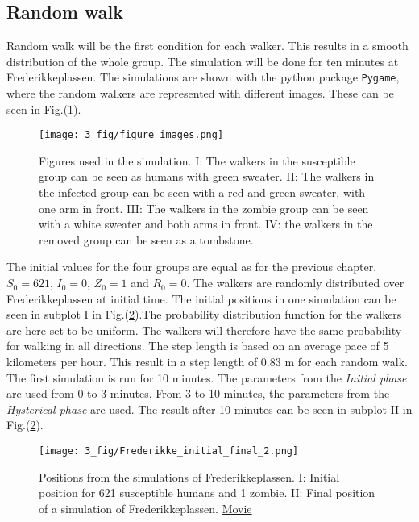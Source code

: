 \documentclass[%
twoside,                 %
final,                   %
chapterprefix=true,      %
open=right               %
10pt]{book}
\begin{document}
\subsection{Random walk}
Random walk will be the first condition for each walker. This results in a smooth distribution of the whole group. The simulation will be done for ten minutes at Frederikkeplassen. The simulations are shown with the python package \Verb!Pygame!, where the random walkers are represented with different images. These can be seen in Fig.(\ref{fig:figure_images}).


\begin{figure}[ht]
  \centerline{\texttt{[image: 3\_fig/figure\_images.png]}}
  \caption{
  \label{fig:figure_images} Figures used in the simulation. I: The walkers in the susceptible group can be seen as humans with green sweater. II: The walkers in the infected group can be seen with a red and green sweater, with one arm in front. III: The walkers in the zombie group can be seen with a white sweater and both arms in front. IV: the walkers in the removed group can be seen as a tombstone.
  }
\end{figure}


The initial values for the four groups are equal as for the previous chapter. $S_0 = 621$, $I_0 = 0$, $Z_0 = 1$ and $R_0 = 0$. The walkers are randomly distributed over Frederikkeplassen at initial time. The initial positions in one simulation can be seen in subplot I in Fig.(\ref{fig:initial_final}).The probability distribution function for the walkers are here set to be uniform. The walkers will therefore have the same probability for walking in all directions. The step length is based on an average pace of 5 kilometers per hour. This result in a step length of 0.83 m for each random walk. The first simulation is run for 10 minutes. The parameters from the \emph{Initial phase} are used from 0 to 3 minutes. From 3 to 10 minutes, the parameters from the \emph{Hysterical phase} are used. The result after 10 minutes can be seen in subplot II in Fig.(\ref{fig:initial_final}). 


\vspace{3mm}




\vspace{3mm}




\begin{figure}[ht]
  \centerline{\texttt{[image: 3\_fig/Frederikke\_initial\_final\_2.png]}}
  \caption{
  \label{fig:initial_final} Positions from the simulations of Frederikkeplassen. I: Initial position for 621 susceptible humans and 1 zombie. II: Final position of a simulation of Frederikkeplassen. \href{{https://torbjornseland.github.io/master}}{Movie}
  }
\end{figure}
\end{document}
